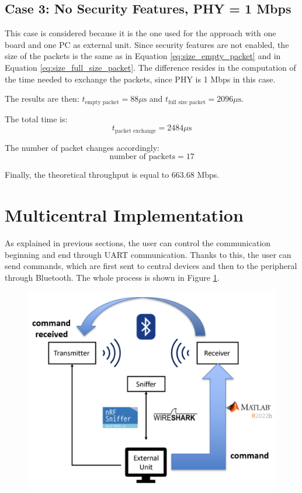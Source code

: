 \documentclass{Configuration_Files/PoliMi3i_thesis}
\begin{document}
\subsection*{Case 3: No Security Features, PHY = 1 Mbps}

This case is considered because it is the one used for the approach with one board and one PC as external unit. Since security features are not enabled, the size of the packets is the same as in Equation \ref{eq:size_empty_packet} and in Equation \ref{eq:size_full_size_packet}. The difference resides in the computation of the time needed to exchange the packets, since PHY is 1 Mbps in this case.

The results are then: $t_{\text{empty packet}} = 88 \mu \text{s}$ and $t_{\text{full size packet}} = 2096 \mu \text{s}$.

The total time is:
\begin{equation}
t_{\text{packet exchange}} = 2484 \mu \text{s}
\label{eq:packet_exchange_case3}
\end{equation}

The number of packet changes accordingly:
\begin{equation}
\text{number of packets} = 17
\label{eq:number_of_packets_case3}
\end{equation}

Finally, the theoretical throughput is equal to 663.68 Mbps.

\section{Multicentral Implementation}
As explained in previous sections, the user can control the communication beginning and end through UART communication. Thanks to this, the user can send commands, which are first sent to central devices and then to the peripheral through Bluetooth. The whole process is shown in Figure \ref{fig:user_command_sending_procedure}.

\begin{figure}[H]
    \centering
    \includegraphics[scale=0.3]{Multicentral/1.png}
    \label{fig:user_command_sending_procedure}
\end{figure}
\end{document}
